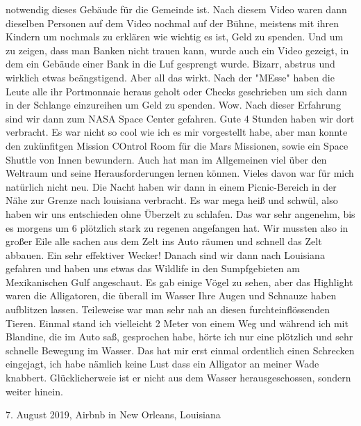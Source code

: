 \documentclass[11pt]{book}
\begin{document}
notwendig dieses Gebäude für die Gemeinde ist. Nach diesem Video waren dann dieselben Personen auf dem Video nochmal auf der Bühne, meistens mit ihren 
Kindern um nochmals zu erklären wie wichtig es ist, Geld zu spenden. Und um zu zeigen, dass man Banken nicht trauen kann, wurde auch ein Video gezeigt, 
in dem ein Gebäude einer Bank in die Luf  gesprengt wurde. Bizarr, abstrus und wirklich etwas beängstigend. Aber all das wirkt. Nach der "MEsse" haben die Leute alle 
ihr Portmonnaie heraus geholt oder Checks geschrieben um sich dann in der Schlange einzureihen um Geld zu spenden. Wow. 
Nach dieser Erfahrung sind wir dann zum NASA Space Center gefahren. Gute 4 Stunden haben wir dort verbracht. Es war nicht so cool wie ich es mir vorgestellt habe, aber 
man konnte den zukünfitgen Mission COntrol Room für die Mars Missionen, sowie ein Space Shuttle von Innen bewundern. Auch hat man im Allgemeinen viel 
über den Weltraum und seine Herausforderungen lernen können. Vieles davon war für mich natürlich nicht neu. 
Die Nacht haben wir dann in einem Picnic-Bereich in der Nähe zur Grenze nach louisiana verbracht. Es war mega heiß und schwül, also haben wir uns entschieden 
ohne Überzelt zu schlafen. Das war sehr angenehm, bis es morgens um 6 plötzlich stark zu regenen angefangen hat. Wir mussten also in großer Eile alle 
sachen aus dem Zelt ins Auto räumen und schnell das Zelt abbauen. Ein sehr effektiver Wecker! Danach sind wir dann nach Louisiana gefahren und haben uns etwas 
das Wildlife in den Sumpfgebieten am Mexikanischen Gulf angeschaut. Es gab einige Vögel zu sehen, aber das Highlight waren die Alligatoren, die überall im Wasser 
Ihre Augen und Schnauze haben aufblitzen lassen. Teileweise war man sehr nah an diesen furchteinflössenden Tieren. Einmal stand ich vielleicht 2 Meter von einem Weg 
und während ich mit Blandine, die im Auto saß, gesprochen habe, hörte ich nur eine plötzlich und sehr schnelle Bewegung im Wasser. Das hat mir erst einmal ordentlich 
einen Schrecken eingejagt, ich habe nämlich keine Lust dass ein Alligator an meiner Wade knabbert. Glücklicherweie ist er nicht aus dem Wasser herausgeschossen, sondern 
weiter hinein. 

7. August 2019, Airbnb in New Orleans, Louisiana
\end{document}
